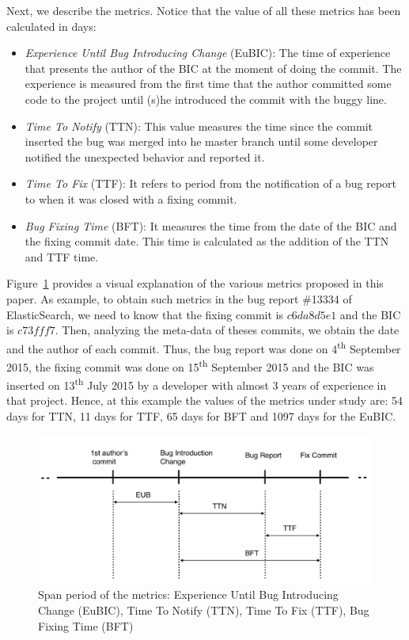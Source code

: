 \documentclass[10pt, conference]{IEEEtran}
\begin{document}
Next, we describe the metrics. Notice that the value of all these metrics has been calculated in days: 

\begin{itemize}
		\item \emph{Experience Until Bug Introducing Change} (EuBIC): The time of experience that presents the author of the BIC at the moment of doing the commit. The experience is measured from the first time that the author committed some code to the project until (s)he introduced the commit with the buggy line.
		\item \emph{Time To Notify} (TTN): This value measures the time since the commit inserted the bug was merged into he master branch until some developer notified the unexpected behavior and reported it. 
		\item \emph{Time To Fix} (TTF): It refers to period from the notification of a bug report to when it was closed with a fixing commit.
		\item \emph{Bug Fixing Time} (BFT): It measures the time from the date of the BIC and the fixing commit date. This time is calculated as the addition of the TTN and TTF time.
\end{itemize} 

Figure~\ref{fig:metrics} provides a visual explanation of the various metrics proposed in this paper. As example, to obtain such metrics in the bug report \#13334 of ElasticSearch, we need to know that the fixing commit is $c6da8d5e1$ and the BIC is $c73fff7$. Then, analyzing the meta-data of theses commits, we obtain the date and the author of each commit. Thus, the bug report was done on 4\textsuperscript{th} September 2015, the fixing commit was done on 15\textsuperscript{th} September 2015 and the BIC was inserted on 13\textsuperscript{th} July 2015 by a developer with almost 3 years of experience in that project. Hence, at this example the values of the metrics under study are: 54 days for TTN, 11 days for TTF, 65 days for BFT and 1097 days for the EuBIC.
\begin{figure}[ht]
\centering
\includegraphics[width=\columnwidth]{metrics.png}
\caption{ Span period of the metrics: Experience Until Bug Introducing Change (EuBIC),  Time To Notify (TTN), Time To Fix (TTF), Bug Fixing Time (BFT) }
\label{fig:metrics}       %
\end{figure}
\end{document}
